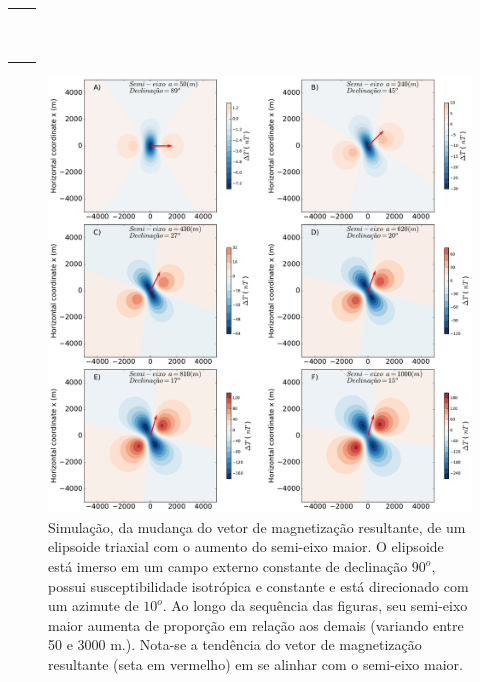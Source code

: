 \begin{table}[h!]
	\begin{center}
		\begin{tabular}{lc}
			
			&  \\
			& \\
			& \\
			&  \\
			& \\
			& \\
			& \\
			& \\
			& \\
			& \\
			
			
		\end{tabular}
	\end{center}
\end{table}

\begin{figure}[hbt!]
	\centering \includegraphics[width=16 cm,height=16 cm]{figures/ellipsoid_shape_iso}
	\caption[Simulação, da mudança do vetor de magnetização resultante, de um elipsoide triaxial com o aumento do semi-eixo maior.]{Simulação, da mudança do vetor de magnetização resultante, de um elipsoide triaxial com o aumento do semi-eixo maior. O elipsoide está imerso em um campo externo constante de declinação $90^o$, possui susceptibilidade isotrópica e constante e está direcionado com um azimute de $10^o$. Ao longo da sequência das figuras, seu semi-eixo maior aumenta de proporção em relação aos demais (variando entre 50 e 3000 m.). Nota-se a tendência do vetor de magnetização resultante (seta em vermelho) em se alinhar com o semi-eixo maior.}
	\label{fig:ellipsoid_shape_iso10}
\end{figure}

